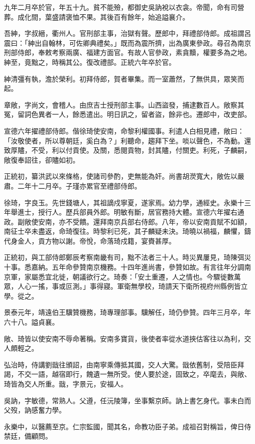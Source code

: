 \begin{pinyinscope}
九年二月卒於官，年五十九。貧不能殮，都御史吳訥裞以衣衾。帝聞，命有司營葬。成化間，葉盛請褒恤不果。其後百有餘年，始追謚襄介。

吾紳，字叔縉，衢州人。官刑部主事，治獄有聲。歷郎中，拜禮部侍郎。成祖謂呂震曰：「紳出自翰林，可佐卿典禮矣。」既而為震所擠，出為廣東參政。尋召為南京刑部侍郎，奉敕考察兩廣、福建方面官。有故人官參政，素貪黷，權要多為之地。紳至，竟黜之，時稱其公。復改禮部。正統六年卒於官。

紳清彊有執，澹於榮利。初拜侍郎，賀者畢集。而一室蕭然，了無供具，眾笑而起。

章敞，字尚文，會稽人。由庶吉士授刑部主事。山西盜發，捕逮數百人。敞察其冤，留詞色異者一人，餘悉遣出。明日訊之，留者盜，餘非也。遷郎中，改吏部。

宣德六年擢禮部侍郎。偕徐琦使安南，命黎利權國事。利遣人白相見禮，敞曰：「汝敬使者，所以尊朝廷，奚白為？」利聽命，趨拜下坐。啖以聲色，不為動。還致厚贐，不受，利以付貢使。及關，悉閱貢物，封其贐，付關吏。利死，子麟嗣，敞復奉詔往，卻贐如初。

正統初，纂洪武以來條格，使諸司參酌，吏無能為奸。尚書胡濙寬大，敞佐以嚴肅。二年十二月卒。子瑾亦累官至禮部侍郎。

徐琦，字良玉。先世錢塘人，其祖謫戍寧夏，遂家焉。幼力學，通經史。永樂十三年舉進士，授行人。歷兵部員外郎。明敏有斷，居官務持大體。宣德六年擢右通政。副敞使安南，亦不受饋。還拜南京兵部右侍郎。八年，帝以安南貢賦不如額，南征士卒未盡返，命琦復往。時黎利已死，其子麟疑未決。琦曉以禍福，麟懼，鑄代身金人，貢方物以謝。帝悅，命落琦戍籍，宴賚甚厚。

正統初，與工部侍郎鄭辰考察南畿有司，黜不法者三十人。時災異屢見，琦陳弭災十事。悉嘉納。五年命參贊南京機務。十四年進尚書，參贊如故。有言往年分調南京軍，家屬悉宜北徙，朝議欲行之。琦奏：「安土重遷，人之情也。今驟徙數萬眾，人心一搖，事或叵測。」事得寢。軍衛無學校，琦請天下衛所視府州縣例皆立學。從之。

景泰元年，靖遠伯王驥贊機務，琦專理部事。驥解任，琦仍參贊。四年三月卒，年六十八。謚貞襄。

敞、琦皆以使安南不辱命著稱。安南多寶貨，後使者率從水道挾估客往以為利，交人頗輕之。

弘治時，侍講劉戩往頒詔，由南寧乘傳抵其國，交人大驚。戩依舊制，受陪臣拜謁，不交一語，越宿即行，餽遺一無所受。使人要於途，固致之，卒麾去，與敞、琦皆為交人所重。戩，字景元，安福人。

吳訥，字敏德，常熟人。父遵，任沅陵簿，坐事繫京師。訥上書乞身代。事未白而父歿，訥感奮力學。

永樂中，以醫薦至京。仁宗監國，聞其名，命教功臣子弟。成祖召對稱旨，俾日侍禁廷，備顧問。


\end{pinyinscope}
